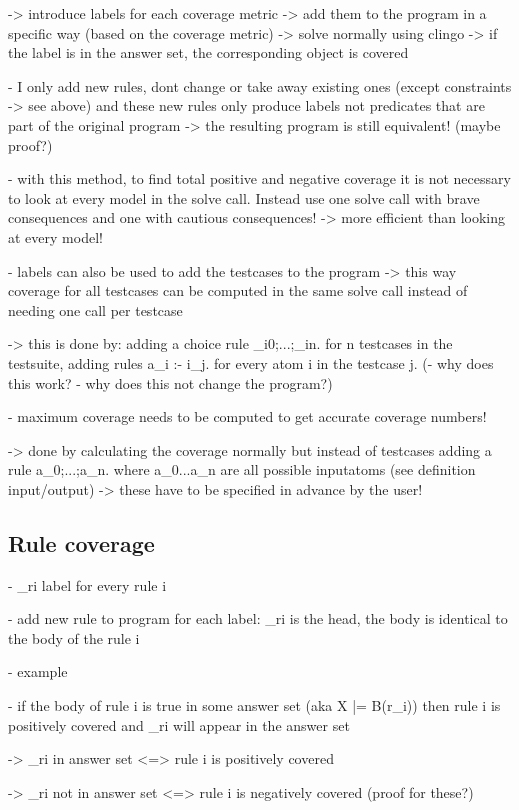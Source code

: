-> introduce labels for each coverage metric -> add them to the program in a specific way (based on the coverage metric)  -> solve 
normally using clingo -> if the label is in the answer set, the corresponding object is covered

- I only add new rules, dont change or take away existing ones (except constraints -> see above) and these new rules only produce 
labels not predicates that are part of the original program -> the resulting program is still equivalent! (maybe proof?)

- with this method, to find total positive and negative coverage it is not necessary to look at every model in the solve call. 
Instead use one solve call with brave consequences and one with cautious consequences! -> more efficient than looking at every model!

- labels can also be used to add the testcases to the program -> this way coverage for all testcases can be computed in the same solve 
call instead of needing one call per testcase

-> this is done by: adding a choice rule {_i0;...;_in}. for n testcases in the testsuite, adding rules a_i :- i_j. for every atom i 
in the testcase j.
(- why does this work?
- why does this not change the program?)

- maximum coverage needs to be computed to get accurate coverage numbers!

-> done by calculating the coverage normally but instead of testcases adding a rule {a_0;...;a_n}. where a_0...a_n are all possible 
inputatoms (see definition input/output) -> these have to be specified in advance by the user!

\subsection{Rule coverage}
\label{subsec:Implementation/General approach/Rule coverage}
- _ri label for every rule i

- add new rule to program for each label: {_ri} is the head, the body is identical to the body of the rule i

- example

- if the body of rule i is true in some answer set (aka X |= B(r_i)) then rule i is positively covered and _ri will appear in the answer set 

-> _ri in answer set <=> rule i is positively covered

-> _ri not in answer set <=> rule i is negatively covered (proof for these?)

